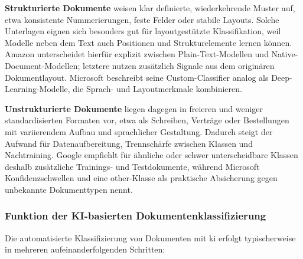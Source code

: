 \textbf{Strukturierte Dokumente} weisen klar definierte, wiederkehrende Muster auf, etwa konsistente Nummerierungen, feste Felder oder stabile Layouts. Solche Unterlagen eignen sich besonders gut für layoutgestützte Klassifikation, weil Modelle neben dem Text auch Positionen und Strukturelemente lernen können. Amazon unterscheidet hierfür explizit zwischen Plain-Text-Modellen und Native-Document-Modellen; letztere nutzen zusätzlich Signale aus dem originären Dokumentlayout. Microsoft beschreibt seine Custom-Classifier analog als Deep-Learning-Modelle, die Sprach- und Layoutmerkmale kombinieren. \cite{aws_comprehend_training_classification_models,azure_document_intelligence_custom_classifier}



\textbf{Unstrukturierte Dokumente} liegen dagegen in freieren und weniger standardisierten Formaten vor, etwa als Schreiben, Verträge oder Bestellungen mit variierendem Aufbau und sprachlicher Gestaltung. Dadurch steigt der Aufwand für Datenaufbereitung, Trennschärfe zwischen Klassen und Nachtraining. Google empfiehlt für ähnliche oder schwer unterscheidbare Klassen deshalb zusätzliche Trainings- und Testdokumente, während Microsoft Konfidenzschwellen und eine \glqq other\grqq{}-Klasse als praktische Absicherung gegen unbekannte Dokumenttypen nennt. \cite{googlecloud_documentai_custom_classifier,azure_document_intelligence_custom_classifier}

\subsubsection{Funktion der KI-basierten Dokumentenklassifizierung}

Die automatisierte Klassifizierung von Dokumenten mit \gls{ki} erfolgt typischerweise in mehreren aufeinanderfolgenden Schritten:

